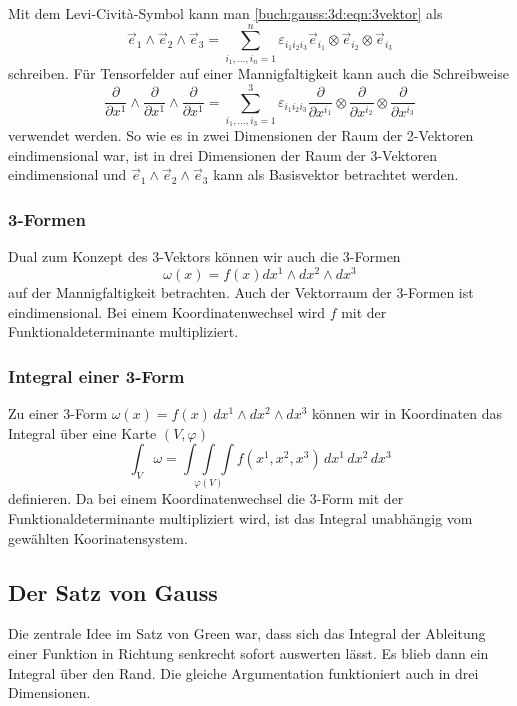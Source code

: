 Mit dem Levi-Cività-Symbol kann man 
\eqref{buch:gauss:3d:eqn:3vektor}
als
\[
\vec{e}_1
\wedge
\vec{e}_2
\wedge
\vec{e}_3
=
\sum_{i_1,\dots,i_n=1}^n
\varepsilon_{i_1 i_2 i_3}
\vec{e}_{i_1}
\otimes
\vec{e}_{i_2}
\otimes
\vec{e}_{i_3}
\]
schreiben.
Für Tensorfelder auf einer Mannigfaltigkeit kann auch die Schreibweise
\[
\frac{\partial}{\partial x^1}
\wedge
\frac{\partial}{\partial x^1}
\wedge
\frac{\partial}{\partial x^1}
=
\sum_{i_1,\dots,i_3=1}^3
\varepsilon_{i_1 i_2 i_3}
\frac{\partial}{\partial x^{i_1}}
\otimes
\frac{\partial}{\partial x^{i_2}}
\otimes
\frac{\partial}{\partial x^{i_3}}
\]
verwendet werden.
So wie es in zwei Dimensionen der Raum der 2-Vektoren eindimensional
war, ist in drei Dimensionen der Raum der 3-Vektoren eindimensional
und $\vec{e}_1\wedge\vec{e}_2\wedge\vec{e}_3$ kann als Basisvektor
betrachtet werden.

%
%
\subsubsection{3-Formen}
Dual zum Konzept des 3-Vektors können wir auch die 3-Formen
\[
\omega(x)
=
f(x)
dx^1 \wedge dx^2 \wedge dx^3
\]
auf der Mannigfaltigkeit betrachten.
Auch der Vektorraum der 3-Formen ist eindimensional.
Bei einem Koordinatenwechsel wird $f$ mit der Funktionaldeterminante
multipliziert.

%
%
\subsubsection{Integral einer 3-Form}
Zu einer 3-Form $\omega(x)=f(x)\,dx^1\wedge dx^2\wedge dx^3$ können wir 
in Koordinaten das Integral über eine Karte $(V,\varphi)$
\[
\int_{V} \omega
=
\underset{\varphi(V)}{\displaystyle\int\!\!\!\int\!\!\!\int}
f(x^1,x^2,x^3)
\,
dx^1\,dx^2\,dx^3
\]
definieren.
Da bei einem Koordinatenwechsel die 3-Form mit der Funktionaldeterminante
multipliziert wird, ist das Integral unabhängig vom gewählten
Koorinatensystem.

%
%
\subsection{Der Satz von Gauss}

Die zentrale Idee im Satz von Green war, dass sich das Integral
der Ableitung einer Funktion in Richtung senkrecht sofort auswerten
lässt.
Es blieb dann ein Integral über den Rand.
Die gleiche Argumentation funktioniert auch in drei Dimensionen.

